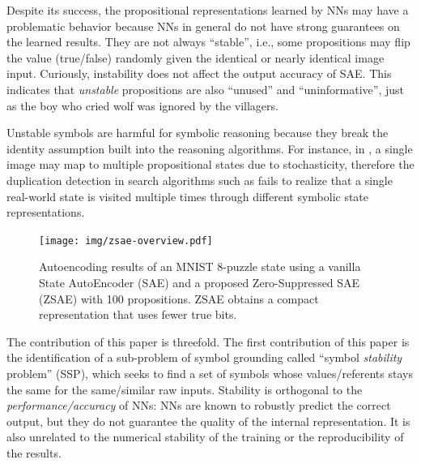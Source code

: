 Despite its success,
the propositional representations learned by NNs may have a problematic behavior
because NNs in general do not have strong guarantees on the learned results.
They are not always ``stable'', i.e.,
some propositions may flip the value (true/false) randomly
given the identical or nearly identical image input.
% 
% 
Curiously, instability does not affect the output accuracy of SAE.
This indicates that \emph{unstable} propositions are also ``unused'' and ``uninformative'',
just as the boy who cried wolf was ignored by the villagers.

Unstable symbols are harmful for symbolic reasoning because
they break the identity assumption built into the reasoning algorithms.
For instance, in \latentplanner, 
a single image may map to multiple propositional states due to stochasticity,
therefore the duplication detection in search algorithms such as \astar \cite{hart1968formal}
fails to realize that a single real-world state is visited multiple times through
different symbolic state representations.

\begin{figure}[tb]
 \centering
 \texttt{[image: img/zsae-overview.pdf]}
 \caption{
Autoencoding results of an MNIST 8-puzzle state
using a vanilla State AutoEncoder (SAE) \cite{Asai2018} and a proposed Zero-Suppressed SAE (ZSAE) with 100 propositions.
ZSAE obtains a compact representation that uses fewer true bits.
}
 \label{zsae-overview}
\end{figure}

The contribution of this paper is threefold.
The first contribution of this paper is the identification of a sub-problem of symbol grounding
called ``symbol \emph{stability} problem'' (SSP), which seeks to find a set of symbols
whose values/referents stays the same for the same/similar raw inputs.
Stability is orthogonal to the \emph{performance/accuracy} of NNs:
NNs are known to robustly predict the correct output, but they do not guarantee
the quality of the internal representation.
It is also unrelated to the numerical stability of the training or the reproducibility of the results.

